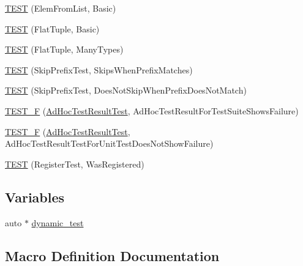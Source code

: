 \begin{DoxyCompactItemize}
\item 
\mbox{\hyperlink{googletest-master_2googletest_2test_2gtest__unittest_8cc_ac3105a7c9cd40f1dfc07152424fb10dc}{T\+E\+ST}} (Elem\+From\+List, Basic)
\item 
\mbox{\hyperlink{googletest-master_2googletest_2test_2gtest__unittest_8cc_a4fd48ea8393706f2dc8f5b3899358a3f}{T\+E\+ST}} (Flat\+Tuple, Basic)
\item 
\mbox{\hyperlink{googletest-master_2googletest_2test_2gtest__unittest_8cc_a14e064220d7b23d6823f681fcdaca59e}{T\+E\+ST}} (Flat\+Tuple, Many\+Types)
\item 
\mbox{\hyperlink{googletest-master_2googletest_2test_2gtest__unittest_8cc_a0c38bd27f49371439ed463c1bb44f444}{T\+E\+ST}} (Skip\+Prefix\+Test, Skips\+When\+Prefix\+Matches)
\item 
\mbox{\hyperlink{googletest-master_2googletest_2test_2gtest__unittest_8cc_afeb79bbd7756bbeca262cb79315856a4}{T\+E\+ST}} (Skip\+Prefix\+Test, Does\+Not\+Skip\+When\+Prefix\+Does\+Not\+Match)
\item 
\mbox{\hyperlink{googletest-master_2googletest_2test_2gtest__unittest_8cc_ab6a117532a0f082cb3c81919bac920af}{T\+E\+S\+T\+\_\+F}} (\mbox{\hyperlink{class_ad_hoc_test_result_test}{Ad\+Hoc\+Test\+Result\+Test}}, Ad\+Hoc\+Test\+Result\+For\+Test\+Suite\+Shows\+Failure)
\item 
\mbox{\hyperlink{googletest-master_2googletest_2test_2gtest__unittest_8cc_aa2c9c77ebded668b7830e50f6be238d9}{T\+E\+S\+T\+\_\+F}} (\mbox{\hyperlink{class_ad_hoc_test_result_test}{Ad\+Hoc\+Test\+Result\+Test}}, Ad\+Hoc\+Test\+Result\+Test\+For\+Unit\+Test\+Does\+Not\+Show\+Failure)
\item 
\mbox{\hyperlink{googletest-master_2googletest_2test_2gtest__unittest_8cc_acc22a4bbd8fccca7340330c689e8eae0}{T\+E\+ST}} (Register\+Test, Was\+Registered)
\end{DoxyCompactItemize}
\subsection*{Variables}
\begin{DoxyCompactItemize}
\item 
auto $\ast$ \mbox{\hyperlink{googletest-master_2googletest_2test_2gtest__unittest_8cc_a0e7f4300994a060678c15c0105f21378}{dynamic\+\_\+test}}
\end{DoxyCompactItemize}


\subsection{Macro Definition Documentation}
\mbox{\label{googletest-master_2googletest_2test_2gtest__unittest_8cc_a0ff3eef0b1e2abfee41bdab9631f41ae}} 
